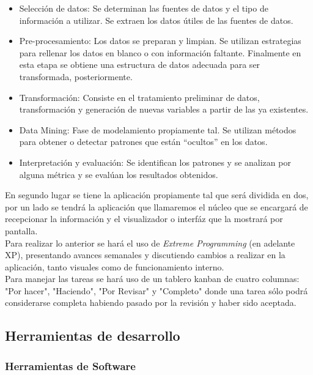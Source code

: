 \begin{itemize}
\item	Selección de datos: Se determinan las fuentes de datos y el tipo de información a utilizar. Se extraen los datos útiles de las fuentes de datos.
\item	Pre-procesamiento: Los datos se preparan y limpian. Se utilizan estrategias para rellenar los datos en blanco o con información faltante. Finalmente en esta etapa se obtiene una estructura de datos adecuada para ser transformada, posteriormente.
\item	Transformación: Consiste en el tratamiento preliminar de datos, transformación y generación de nuevas variables a partir de las ya existentes. 
\item	Data Mining: Fase de modelamiento propiamente tal. Se utilizan métodos para obtener o detectar patrones que están “ocultos” en los datos.
\item	Interpretación y evaluación: Se identifican los patrones y se analizan por alguna métrica y se evalúan los resultados obtenidos.
\end{itemize}

En segundo lugar se tiene la aplicación propiamente tal que será dividida en dos, por un lado se tendrá la aplicación que llamaremos el núcleo que se encargará de recepcionar la información y el visualizador o interfáz que la mostrará por pantalla.\\

Para realizar lo anterior se hará el uso de \textit{Extreme Programming} (en adelante XP), presentando avances semanales y discutiendo cambios a realizar en la aplicación, tanto visuales como de funcionamiento interno.\\

Para manejar las tareas se hará uso de un tablero kanban de cuatro columnas: "Por hacer", "Haciendo", "Por Revisar" y "Completo" donde una tarea sólo podrá considerarse completa habiendo pasado por la revisión y haber sido aceptada.\\

\subsection{Herramientas de desarrollo}

\subsubsection{Herramientas de Software}

